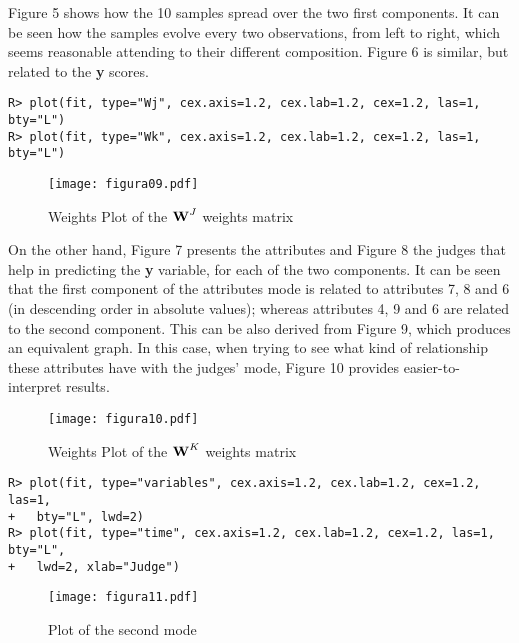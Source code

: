 Figure 5 shows how the 10 samples spread over the two first components. It can be seen how the samples evolve every two observations, from left to right, which seems reasonable attending to their different composition. Figure 6 is similar, but related to the \textbf{y} scores. 

\begin{verbatim}
R> plot(fit, type="Wj", cex.axis=1.2, cex.lab=1.2, cex=1.2, las=1, bty="L")
R> plot(fit, type="Wk", cex.axis=1.2, cex.lab=1.2, cex=1.2, las=1, bty="L")
\end{verbatim}

\begin{figure}[!ht]
\centering
\texttt{[image: figura09.pdf]}
\caption{Weights Plot of the $\textbf{\text{W}}^{J}$ weights matrix}
\label{figura09}
\end{figure}

On the other hand, Figure 7 presents the attributes and Figure 8 the judges that help in predicting the \textbf{y} variable, for each of the two components. It can be seen that the first component of the attributes mode is related to attributes 7, 8 and 6 (in descending order in absolute values); whereas attributes 4, 9 and 6 are related to the second component. This can be also derived from Figure 9, which produces an equivalent graph. In this case, when trying to see what kind of relationship these attributes have with the judges’ mode, Figure 10 provides easier-to-interpret results.

\begin{figure}[!ht]
\centering
\texttt{[image: figura10.pdf]}
\caption{Weights Plot of the $\textbf{\text{W}}^{K}$ weights matrix}
\label{figura10}
\end{figure}

\begin{verbatim}
R> plot(fit, type="variables", cex.axis=1.2, cex.lab=1.2, cex=1.2, las=1, 
+   bty="L", lwd=2)
R> plot(fit, type="time", cex.axis=1.2, cex.lab=1.2, cex=1.2, las=1, bty="L", 
+   lwd=2, xlab="Judge")
\end{verbatim}

\begin{figure}[!ht]
	\centering
\texttt{[image: figura11.pdf]}
\caption{Plot of the second mode}
\label{figura11}
\end{figure}

